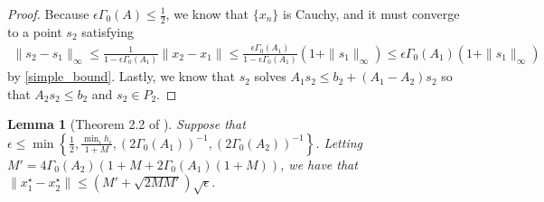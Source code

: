 \documentclass{article}
\newtheorem{lemma}[theorem]{Lemma}
\theoremstyle{case}
\newcommand{\huff}{{\Gamma_0}}
\begin{document}
\begin{proof}
Because $\epsilon \huff(A)\le\frac 1 2$, we know that $\{x_n\}$ is Cauchy, and it must converge to a point $s_2$ satisfying
\begin{align*}
\|s_2 - s_1\|_\infty \le \frac{1}{1 - \epsilon\huff(A_1)}\|x_2 - x_1\| \le \frac{\epsilon\huff(A_1)}{1 - \epsilon\huff(A_1)}\left(1 + \|s_1\|_{\infty}\right) \le \epsilon\huff(A_1)\left(1 + \|s_1\|_{\infty}\right)
\end{align*}
by \cref{simple_bound}.
Lastly, we know that $s_2$ solves $A_1s_2 \le b_2 + (A_1 - A_2)s_2$ so that $A_2s_2 \le b_2$ and $s_2 \in P_2$.
\end{proof}



\begin{lemma}[Theorem 2.2 of \cite{dummy:continuity}]
\label{2_2}
Suppose that $\epsilon\le \min\left\{\frac 1 2, \frac{\min_i h_i}{1 + M},\left(2\huff(A_1)\right)^{-1}, \left(2\huff(A_2)\right)^{-1}\right\}$.
Letting $M' = 4\huff(A_2)\left(1 + M + 2\huff(A_1)\left(1 + M\right)\right)$, we have that $\|x_1^{\star} - x_2^{\star}\| \le \left( M' + \sqrt{2MM'}\right)\sqrt{\epsilon}$.
\end{lemma}
\end{document}
